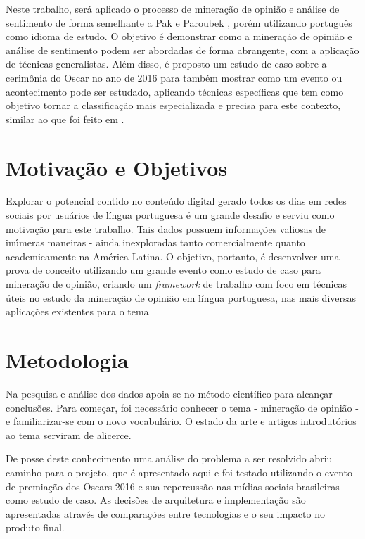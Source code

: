 Neste trabalho, será aplicado o processo de mineração de opinião e análise de sentimento de forma semelhante a Pak e Paroubek \cite{pak2010twitter}, porém utilizando português como idioma de estudo. O objetivo é demonstrar como a mineração de opinião e análise de sentimento podem ser abordadas de forma abrangente, com a aplicação de técnicas generalistas. Além disso, é proposto um estudo de caso sobre a cerimônia do Oscar no ano de 2016 para também mostrar como um evento ou acontecimento pode ser estudado, aplicando técnicas específicas que tem como objetivo tornar a classificação mais especializada e precisa para este contexto, similar ao que foi feito em \cite{rodrigues2012characterizing} \cite{franca2014analise} \cite{carvalho2014mineraccao}.


\section{Motivação e Objetivos}\label{sec:1_inicio}
Explorar o potencial contido no conteúdo digital gerado todos os dias em redes sociais por usuários de língua portuguesa é um grande desafio e serviu como motivação para este trabalho. Tais dados possuem informações valiosas de inúmeras maneiras - ainda inexploradas tanto comercialmente quanto academicamente na América Latina. 
O objetivo, portanto, é desenvolver uma prova de conceito utilizando um grande evento como estudo de caso para mineração de opinião, criando um \textit{framework} de trabalho com foco em técnicas úteis no estudo da mineração de opinião em língua portuguesa, nas mais diversas aplicações existentes para o tema


\section{Metodologia}
Na pesquisa e análise dos dados apoia-se no método científico para alcançar conclusões. Para começar, foi necessário conhecer o tema - mineração de opinião - e familiarizar-se com o novo vocabulário. O estado da arte e artigos introdutórios ao tema serviram de alicerce.

De posse deste conhecimento uma análise do problema a ser resolvido abriu caminho para o projeto, que é apresentado aqui e foi testado utilizando o evento de premiação dos Oscars 2016 e sua repercussão nas mídias sociais brasileiras como estudo de caso. As decisões de arquitetura e implementação são apresentadas através de comparações entre tecnologias e o seu impacto no produto final.


